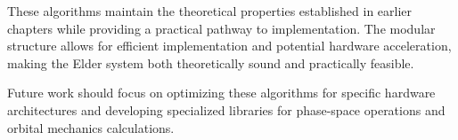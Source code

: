 These algorithms maintain the theoretical properties established in earlier chapters while providing a practical pathway to implementation. The modular structure allows for efficient implementation and potential hardware acceleration, making the Elder system both theoretically sound and practically feasible.

Future work should focus on optimizing these algorithms for specific hardware architectures and developing specialized libraries for phase-space operations and orbital mechanics calculations.